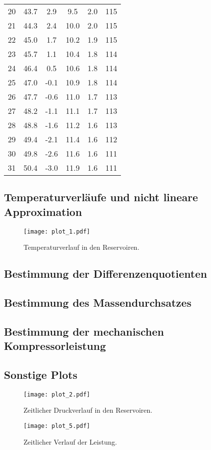\begin{table}[H]
\begin{tabular}{S[table-format=2.0] S S S S S[table-format=3.0]}
    20 & 43.7 &  2.9 &  9.5 & 2.0 & 115 \\
    21 & 44.3 &  2.4 & 10.0 & 2.0 & 115 \\
    22 & 45.0 &  1.7 & 10.2 & 1.9 & 115 \\
    23 & 45.7 &  1.1 & 10.4 & 1.8 & 114 \\
    24 & 46.4 &  0.5 & 10.6 & 1.8 & 114 \\
    25 & 47.0 & {-0.1} & 10.9 & 1.8 & 114 \\
    26 & 47.7 & {-0.6} & 11.0 & 1.7 & 113 \\
    27 & 48.2 & {-1.1} & 11.1 & 1.7 & 113 \\
    28 & 48.8 & {-1.6} & 11.2 & 1.6 & 113 \\
    29 & 49.4 & {-2.1} & 11.4 & 1.6 & 112 \\
    30 & 49.8 & {-2.6} & 11.6 & 1.6 & 111 \\
    31 & 50.4 & {-3.0} & 11.9 & 1.6 & 111 \\
    \bottomrule
  \end{tabular}
\end{table}

\subsection{Temperaturverläufe und nicht lineare Approximation}

\begin{figure}[H]
  \centering
  \texttt{[image: plot\_1.pdf]}
  \caption{Temperaturverlauf in den Reservoiren.}
  \label{fig:plot1}
\end{figure}

\subsection{Bestimmung der Differenzenquotienten}

\subsection{Bestimmung des Massendurchsatzes}

\subsection{Bestimmung der mechanischen Kompressorleistung}


\subsection{Sonstige Plots}

\begin{figure}
  \centering
  \texttt{[image: plot\_2.pdf]}
  \caption{Zeitlicher Druckverlauf in den Reservoiren.}
  \label{fig:plot3}
\end{figure}


\begin{figure}
  \centering
  \texttt{[image: plot\_5.pdf]}
  \caption{Zeitlicher Verlauf der Leistung.}
  \label{fig:plot5}
\end{figure}
